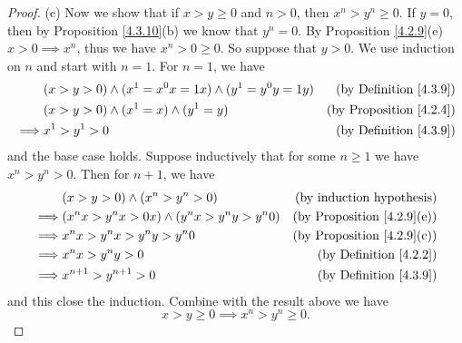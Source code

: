\begin{proof}{(c)}
    Now we show that if \(x > y \geq 0\) and \(n > 0\), then \(x^n > y^n \geq 0\).
    If \(y = 0\), then by Proposition \ref{4.3.10}(b) we know that \(y^n = 0\).
    By Proposition \ref{4.2.9}(e) \(x > 0 \implies x^n\), thus we have \(x^n > 0 \geq 0\).
    So suppose that \(y > 0\).
    We use induction on \(n\) and start with \(n = 1\).
    For \(n = 1\), we have
    \begin{align*}
                 & (x > y > 0) \land (x^1 = x^0 x = 1x) \land (y^1 = y^0 y = 1y) & \text{(by Definition \ref{4.3.9})}  \\
                 & (x > y > 0) \land (x^1 = x) \land (y^1 = y)                   & \text{(by Proposition \ref{4.2.4})} \\
        \implies & x^1 > y^1 > 0                                                 & \text{(by Definition \ref{4.3.9})}
    \end{align*}
    and the base case holds.
    Suppose inductively that for some \(n \geq 1\) we have \(x^n > y^n > 0\).
    Then for \(n + 1\), we have
    \begin{align*}
                 & (x > y > 0) \land (x^n > y^n > 0)                  & \text{(by induction hypothesis)}       \\
        \implies & (x^n x > y^n x > 0x) \land (y^n x > y^n y > y^n 0) & \text{(by Proposition \ref{4.2.9}(e))} \\
        \implies & x^n x > y^n x > y^n y > y^n 0                      & \text{(by Proposition \ref{4.2.9}(c))} \\
        \implies & x^n x > y^n y > 0                                  & \text{(by Definition \ref{4.2.2})}     \\
        \implies & x^{n + 1} > y^{n + 1} > 0                          & \text{(by Definition \ref{4.3.9})}
    \end{align*}
    and this close the induction.
    Combine with the result above we have
    \[
        x > y \geq 0 \implies x^n > y^n \geq 0.
    \]
\end{proof}

